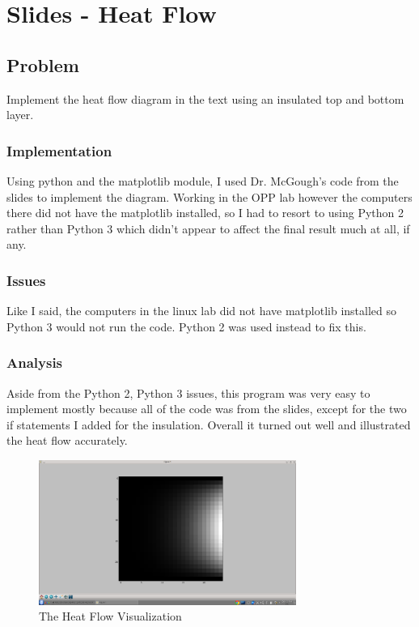 
\chapter{Slides - Heat Flow}

\section{Problem}

	Implement the heat flow diagram in the text using an insulated top and bottom layer.  

\subsection{Implementation}

	Using python and the matplotlib module, I used Dr. McGough's code from the slides to implement the diagram.  Working in the OPP lab however the computers there did not have the matplotlib installed, so I had to resort to using Python 2 rather than Python 3 which didn't appear to affect the final result much at all, if any.

\subsection{Issues}

	Like I said, the computers in the linux lab did not have matplotlib installed so Python 3 would not run the code.  Python 2 was used instead to fix this.

\subsection{Analysis}

	Aside from the Python 2, Python 3 issues, this program was very easy to implement mostly because all of the code was from the slides, except for the two if statements I added for the insulation.  Overall it turned out well and illustrated the heat flow accurately.

\begin{figure}[tbh]
\begin{center}
\includegraphics[width=0.75\textwidth]{heatflow.png}
\end{center}
\caption{The Heat Flow Visualization\label{fig:gprun}}
\end{figure}
